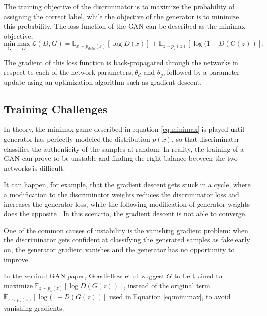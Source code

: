 \documentclass[12pt]{report}
\begin{document}
The training objective of the discriminator is to maximize the probability of assigning the correct label, while the objective of the generator is to minimize this probability. The loss function of the GAN can be described as the minimax objective,
\begin{equation}
\underset{G}{\mathrm{min}} \ \underset{D}{\mathrm{max}} \ \mathcal{L}(D,G) = \mathbb{E}_{x \sim p_{data}(x)}[\log D(x)] + \mathbb{E}_{z \sim p_{z}(z)}[\log (1 - D(G(z))].
\label{eq:minimax}
\end{equation}

The gradient of this loss function is back-propagated through the networks in respect to each of the network parameters, $\theta_{d}$ and $\theta_{g}$, followed by a parameter update using an optimization algorithm such as gradient descent.

\subsection{Training Challenges} \label{sec:gan_diff}

In theory, the minimax game described in equation \ref{eq:minimax} is played until generator has perfectly modeled the distribution $p(x)$, so that discriminator classifies the authenticity of the samples at random. In reality, the training of a GAN can prove to be unstable and finding the right balance between the two networks is difficult.

It can happen, for example, that the gradient descent gets stuck in a cycle, where a modification to the discriminator weights reduces the discriminator loss and increases the generator loss, while the following modification of generator weights does the opposite \cite{salimans_improved_2016}. In this scenario, the gradient descent is not able to converge.

One of the common causes of instability is the vanishing gradient problem: when the discriminator gets confident at classifying the generated samples as fake early on, the generator gradient vanishes and the generator has no opportunity to improve. 

In the seminal GAN paper, Goodfellow et al. \cite{goodfellow_generative_2014} suggest $G$ to be trained to maximize $\mathbb{E}_{z \sim p_{z}(z)}[\log D(G(z))]$, instead of the original term $\mathbb{E}_{z \sim p_{z}(z)}[\log (1 - D(G(z))]$ used in Equation \ref{eq:minimax}, to avoid vanishing gradients. 
\end{document}
